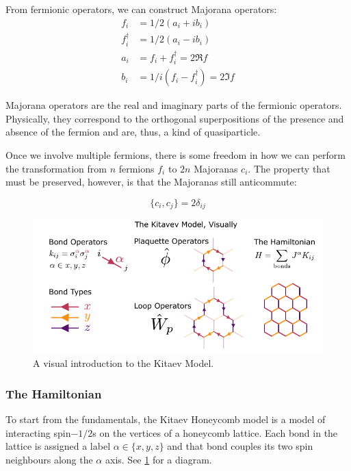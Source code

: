 From fermionic operators, we can construct Majorana operators: \[\begin{aligned}
f_i         &= 1/2 (a_i + ib_i)\\
f^\dagger_i &= 1/2(a_i - ib_i)\\
a_i         &= f_i + f^\dagger_i = 2\Re f\\
b_i         &= 1/i(f_i - f^\dagger_i) = 2\Im f 
\end{aligned}\]

Majorana operators are the real and imaginary parts of the fermionic operators. Physically, they correspond to the orthogonal superpositions of the presence and absence of the fermion and are, thus, a kind of quasiparticle.

Once we involve multiple fermions, there is some freedom in how we can perform the transformation from \(n\) fermions \(f_i\) to \(2n\) Majoranas \(c_i\). The property that must be preserved, however, is that the Majoranas still anticommute:

\[ \{c_i, c_j\} = 2\delta_{ij}\]

\begin{figure}
\hypertarget{fig:visual_kitaev_1}{%
\centering
\includegraphics[width=1\textwidth,height=\textheight]{figure_code/amk_chapter/visual_kitaev_1.pdf}
\caption{A visual introduction to the Kitaev Model.}\label{fig:visual_kitaev_1}
}
\end{figure}

\hypertarget{the-hamiltonian}{%
\subsubsection{The Hamiltonian}\label{the-hamiltonian}}

To start from the fundamentals, the Kitaev Honeycomb model is a model of interacting spin\(-1/2\)s on the vertices of a honeycomb lattice. Each bond in the lattice is assigned a label \(\alpha \in \{ x, y, z\}\) and that bond couples its two spin neighbours along the \(\alpha\) axis. See \cref{fig:visual_kitaev_1} for a diagram.

